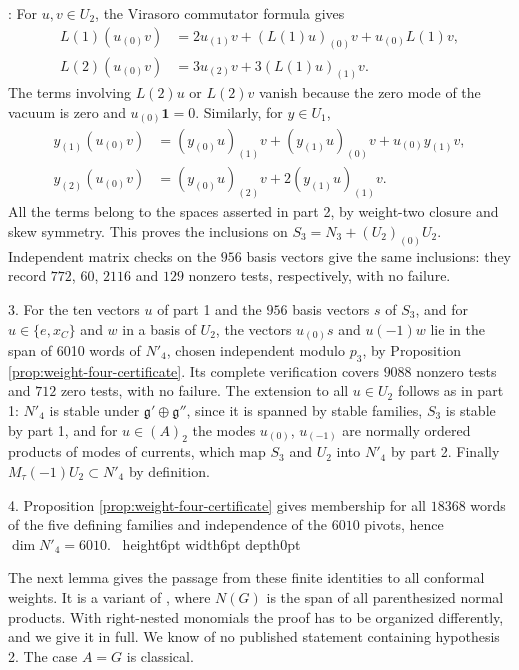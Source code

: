 \documentclass[leqno]{article}
\newcommand{\qed}{\hfill \vrule height6pt  width6pt depth0pt}
\newenvironment{proof}[1][]{\noindent {\it Proof #1} : }{\hbox{~}\qed
\smallskip
}
\numberwithin{equation}{section}
\begin{document}
\begin{proof}
For $u,v \in U_2$, the Virasoro commutator formula gives
\[
\begin{aligned}
L(1)(u_{(0)}v) &= 2u_{(1)}v+(L(1)u)_{(0)}v+u_{(0)}L(1)v,\\
L(2)(u_{(0)}v) &= 3u_{(2)}v+3(L(1)u)_{(1)}v.
\end{aligned}
\]
The terms involving $L(2)u$ or $L(2)v$ vanish because the zero mode of the vacuum is zero and $u_{(0)}\mathbf 1 = 0$. Similarly, for $y \in U_1$,
\[
\begin{aligned}
y_{(1)}(u_{(0)}v) &= (y_{(0)}u)_{(1)}v+(y_{(1)}u)_{(0)}v+u_{(0)}y_{(1)}v,\\
y_{(2)}(u_{(0)}v) &= (y_{(0)}u)_{(2)}v+2(y_{(1)}u)_{(1)}v.
\end{aligned}
\]
All the terms belong to the spaces asserted in part 2, by weight-two closure and skew symmetry. This proves the inclusions on $S_3 = N_3+(U_2)_{(0)}U_2$. Independent matrix checks on the $956$ basis vectors give the same inclusions: they record $772$, $60$, $2116$ and $129$ nonzero tests, respectively, with no failure.

3. For the ten vectors $u$ of part 1 and the $956$ basis vectors $s$ of $S_3$, and for $u \in \{e,x_C\}$ and $w$ in a basis of $U_2$, the vectors $u_{(0)}s$ and $u(-1)w$ lie in the span of 6010 words of $N'_4$, chosen independent modulo $p_3$, by Proposition \ref{prop:weight-four-certificate}. Its complete verification covers $9088$ nonzero tests and $712$ zero tests, with no failure. The extension to all $u \in U_2$ follows as in part 1: $N'_4$ is stable under $\mathfrak g' \oplus \mathfrak g''$, since it is spanned by stable families, $S_3$ is stable by part 1, and for $u \in (A)_2$ the modes $u_{(0)}$, $u_{(-1)}$ are normally ordered products of modes of currents, which map $S_3$ and $U_2$ into $N'_4$ by part 2. Finally $M_\tau(-1)U_2 \subset N'_4$ by definition.

4. Proposition \ref{prop:weight-four-certificate} gives membership for all $18368$ words of the five defining families and independence of the $6010$ pivots, hence $\dim N'_4 = 6010$.
\end{proof}

The next lemma gives the passage from these finite identities to all conformal weights. It is a variant of \cite[Lemma 4.3]{Rie26b}, where $N(G)$ is the span of all parenthesized normal products. With right-nested monomials the proof has to be organized differently, and we give it in full. We know of no published statement containing hypothesis 2. The case $A = G$ is classical.
\end{document}
